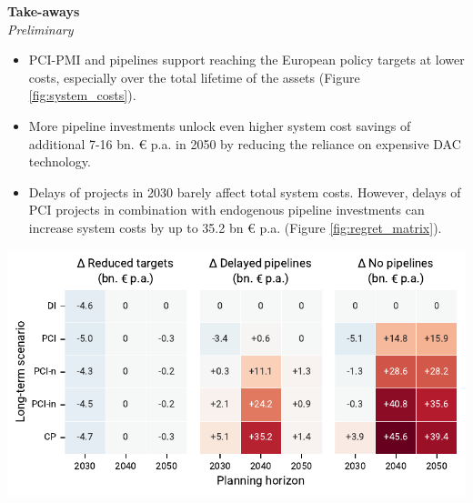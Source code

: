 \documentclass[a0,portrait]{a0poster}
\begin{document}
\begin{multicols}{3}


\columnbreak
\noindent \textcolor{red100}{\huge \textbf{Take-aways}}
\\
\textit{Preliminary}
\begin{itemize}
  \item PCI-PMI  and  pipelines support reaching the European policy targets at lower costs, especially over the total lifetime of the assets (Figure \ref{fig:system_costs}).
  \item More pipeline investments unlock even higher system cost savings of additional 7-16 bn. \euro{} p.a. in 2050 by reducing the reliance on expensive DAC technology.
  \item Delays of projects in 2030 barely affect total system costs. However, delays of PCI projects in combination with endogenous pipeline investments can increase system costs by up to 35.2 bn \euro{} p.a. (Figure \ref{fig:regret_matrix}).
\end{itemize}

\vspace{0.5em}
\begin{center}
    \includegraphics[width=\linewidth]{regret_matrix.pdf}
    \label{fig:regret_matrix}
\end{center}
\vspace{0.5em}


\end{multicols}
\end{document}
